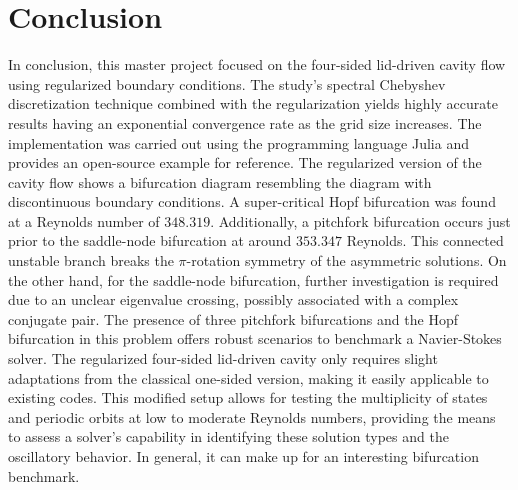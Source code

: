 
\clearpage

\section{Conclusion} \label{concl}

In conclusion, this master project focused on the four-sided lid-driven cavity flow using
regularized boundary conditions. The study's spectral Chebyshev discretization
technique combined with the regularization yields highly accurate results
having an exponential convergence rate as the grid size increases. The
implementation was carried out using the programming language Julia and
provides an open-source example for reference. The regularized version of the
cavity flow shows a bifurcation diagram resembling the diagram with
discontinuous boundary conditions. A super-critical Hopf bifurcation was found
at a Reynolds number of $348.319$. Additionally, a pitchfork bifurcation occurs
just prior to the saddle-node bifurcation at around $353.347$ Reynolds. This
connected unstable branch breaks the $\pi$-rotation symmetry of the asymmetric
solutions. On the other hand, for the saddle-node bifurcation, further
investigation is required due to an unclear eigenvalue crossing, possibly
associated with a complex conjugate pair. The presence of three pitchfork
bifurcations and the Hopf bifurcation in this problem offers robust scenarios
to benchmark a Navier-Stokes solver. The regularized four-sided lid-driven
cavity only requires slight adaptations from the classical one-sided version,
making it easily applicable to existing codes. This modified setup allows for
testing the multiplicity of states and periodic orbits at low to moderate
Reynolds numbers, providing the means to assess a solver's capability in
identifying these solution types and the oscillatory behavior. In general, it
can make up for an interesting bifurcation benchmark.
